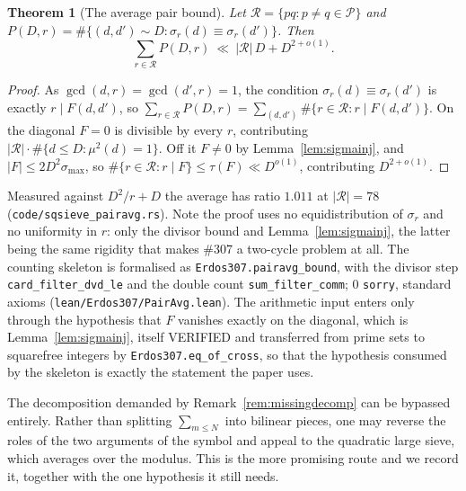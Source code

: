 \documentclass[11pt]{article}
\newtheorem{theorem}{Theorem}[section]
\theoremstyle{definition}
\begin{document}
\begin{theorem}[The average pair bound]\label{thm:pairavg}
Let $\mathcal{R}=\{pq:p\neq q\in\mathcal{P}\}$ and
$P(D,r)=\#\{(d,d')\sim D:\sigma_r(d)\equiv\sigma_r(d')\}$. Then
\[ \sum_{r\in\mathcal{R}}P(D,r)\ \ll\ |\mathcal{R}|\,D+D^{2+o(1)} . \]
\end{theorem}
\begin{proof}
As $\gcd(d,r)=\gcd(d',r)=1$, the condition $\sigma_r(d)\equiv\sigma_r(d')$ is exactly $r\mid F(d,d')$,
so $\sum_{r\in\mathcal{R}}P(D,r)=\sum_{(d,d')}\#\{r\in\mathcal{R}:r\mid F(d,d')\}$. On the diagonal
$F=0$ is divisible by every $r$, contributing $|\mathcal{R}|\cdot\#\{d\le D:\mu^2(d)=1\}$. Off it
$F\neq0$ by Lemma~\ref{lem:sigmainj}, and $|F|\le2D^2\sigma_{\max}$, so
$\#\{r\in\mathcal{R}:r\mid F\}\le\tau(F)\ll D^{o(1)}$, contributing $D^{2+o(1)}$.
\end{proof}
Measured against $D^2/r+D$ the average has ratio $1.011$ at $|\mathcal{R}|=78$
\textup{(\texttt{code/sqsieve\_pairavg.rs})}. Note the proof uses no equidistribution of $\sigma_r$
and no uniformity in $r$: only the divisor bound and Lemma~\ref{lem:sigmainj}, the latter being the
same rigidity that makes \#307 a two-cycle problem at all. The counting skeleton is formalised as
\texttt{Erdos307.pairavg\_bound}, with the divisor step \texttt{card\_filter\_dvd\_le} and the
double count \texttt{sum\_filter\_comm}; $0$ \texttt{sorry}, standard axioms
\textup{(\texttt{lean/Erdos307/PairAvg.lean})}. The arithmetic input enters only through the
hypothesis that $F$ vanishes exactly on the diagonal, which is Lemma~\ref{lem:sigmainj}, itself
\textup{VERIFIED} and transferred from prime sets to squarefree integers by
\texttt{Erdos307.eq\_of\_cross}, so that the hypothesis consumed by the skeleton is exactly the
statement the paper uses.

The decomposition demanded by Remark~\ref{rem:missingdecomp} can be bypassed entirely. Rather than
splitting $\sum_{m\le N}$ into bilinear pieces, one may reverse the roles of the two arguments of the
symbol and appeal to the quadratic large sieve, which averages over the modulus. This is the more
promising route and we record it, together with the one hypothesis it still needs.
\end{document}
